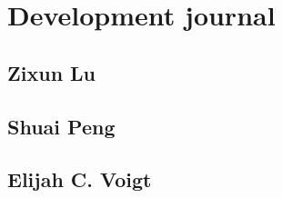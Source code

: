 \section{Development journal}

\subsection{Zixun Lu}


\subsection{Shuai Peng}


\subsection{Elijah C. Voigt}

